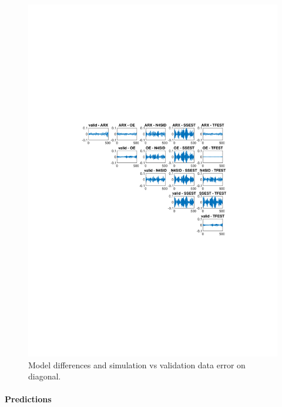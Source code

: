 \documentclass[]{article}
\begin{document}
\begin{figure}[ht]
\centering
\includegraphics[trim= 10cm 8cm 10cm 8cm, scale=0.7]{figures/sim_diff_matrix.pdf}
\caption{Model differences and simulation vs validation data error on diagonal.}
\label{fig:model_differences_simulation}
\end{figure}

\paragraph{Predictions}
\end{document}
